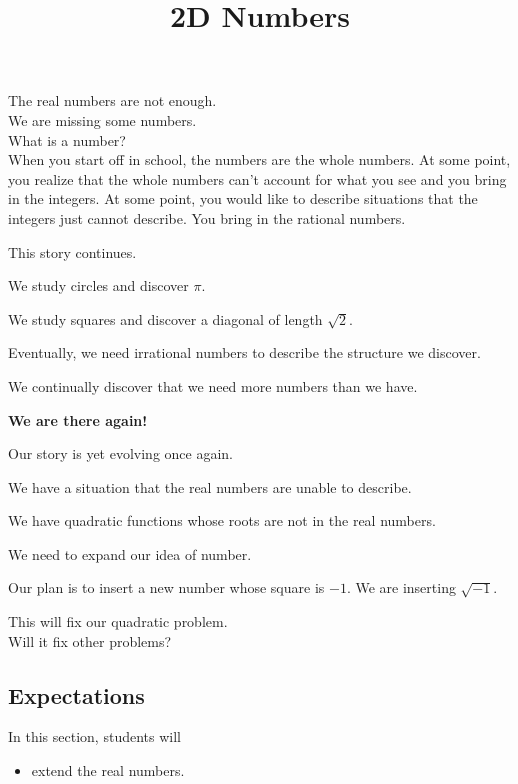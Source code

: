 \documentclass{ximera}
\title{2D Numbers}
\begin{document}
\begin{abstract}
\end{abstract}
\maketitle





The real numbers are not enough. \\


We are missing some numbers. \\


What is a number? \\


When you start off in school, the numbers are the whole numbers.  At some point, you realize that the whole numbers can't account for what you see and you bring in the integers.  At some point, you would like to describe situations that the integers just cannot describe.  You bring in the rational numbers. 


This story continues.

We study circles and discover $\pi$.

We study squares and discover a diagonal of length $\sqrt{2}$.


Eventually, we need irrational numbers to describe the structure we discover.


We continually discover that we need more numbers than we have. \\


\begin{center}
\textbf{\textcolor{red!90!darkgray}{We are there again!}}
\end{center}


Our story is yet evolving once again.


\begin{explanation}

We have a situation that the real numbers are unable to describe.


We have quadratic functions whose roots are not in the real numbers.  


We need to expand our idea of number.

\end{explanation}



Our plan is to insert a new number whose square is $-1$.  We are inserting $\sqrt{-1}$.  


This will fix our quadratic problem. \\


Will it fix other problems?






\subsection{Expectations}



\begin{sectionOutcomes}
In this section, students will 

\begin{itemize}
\item extend the real numbers.
\end{itemize}
\end{sectionOutcomes}
\end{document}
